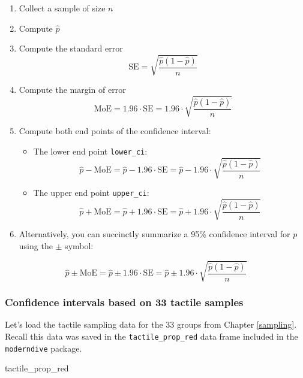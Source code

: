 \documentclass[12pt, krantz2,]{krantz}
\makeatletter
\newenvironment{Shaded}{\begin{snugshade}}{\end{snugshade}}
\newcommand{\NormalTok}[1]{#1}
\providecommand{\tightlist}{%
  \setlength{\itemsep}{0pt}\setlength{\parskip}{0pt}}
\newenvironment{kframe}{%
\medskip{}
\setlength{\fboxsep}{.8em}
 \def\at@end@of@kframe{}%
 \ifinner\ifhmode%
  \def\at@end@of@kframe{\end{minipage}}%
  \begin{minipage}{\columnwidth}%
 \fi\fi%
 \def\FrameCommand##1{\hskip\@totalleftmargin \hskip-\fboxsep
 \colorbox{shadecolor}{##1}\hskip-\fboxsep
     \hskip-\linewidth \hskip-\@totalleftmargin \hskip\columnwidth}%
 \MakeFramed {\advance\hsize-\width
   \@totalleftmargin\z@ \linewidth\hsize
   \@setminipage}}%
 {\par\unskip\endMakeFramed%
 \at@end@of@kframe}
\renewenvironment{Shaded}{\begin{kframe}}{\end{kframe}}
\makeatother
\begin{document}
\begin{enumerate}
\def\labelenumi{\arabic{enumi}.}
\tightlist
\item
  Collect a sample of size \(n\)
\item
  Compute \(\widehat{p}\)
\item
  Compute the standard error \[\text{SE} = \sqrt{\frac{\widehat{p}(1-\widehat{p})}{n}}\]
\item
  Compute the margin of error \[\text{MoE} = 1.96 \cdot \text{SE} =  1.96 \cdot \sqrt{\frac{\widehat{p}(1-\widehat{p})}{n}}\]
\item
  Compute both end points of the confidence interval:

  \begin{itemize}
  \tightlist
  \item
    The lower end point \texttt{lower\_ci}: \[\widehat{p} - \text{MoE} = \widehat{p} - 1.96 \cdot \text{SE} = \widehat{p} - 1.96 \cdot \sqrt{\frac{\widehat{p}(1-\widehat{p})}{n}}\]
  \item
    The upper end point \texttt{upper\_ci}: \[\widehat{p} + \text{MoE} = \widehat{p} + 1.96 \cdot \text{SE} = \widehat{p} + 1.96 \cdot \sqrt{\frac{\widehat{p}(1-\widehat{p})}{n}}\]
  \end{itemize}
\item
  Alternatively, you can succinctly summarize a 95\% confidence interval for \(p\) using the \(\pm\) symbol:
\end{enumerate}

\[
\widehat{p} \pm \text{MoE} = \widehat{p} \pm 1.96 \cdot \text{SE} = \widehat{p} \pm 1.96 \cdot \sqrt{\frac{\widehat{p}(1-\widehat{p})}{n}}
\]

\hypertarget{confidence-intervals-based-on-33-tactile-samples}{%
\subsubsection*{Confidence intervals based on 33 tactile samples}\label{confidence-intervals-based-on-33-tactile-samples}}


Let's load the tactile sampling data for the 33 groups from Chapter \ref{sampling}. Recall this data was saved in the \texttt{tactile\_prop\_red} data frame included in the \texttt{moderndive} package.

\begin{Shaded}
\begin{Highlighting}[]
\NormalTok{tactile_prop_red}
\end{Highlighting}
\end{Shaded}
\end{document}
